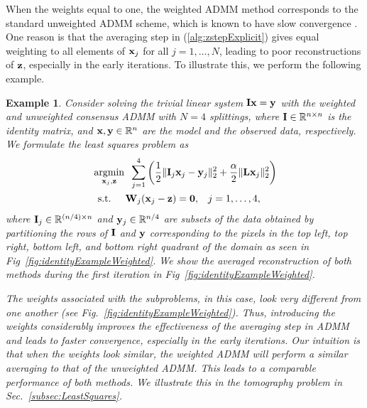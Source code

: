 \documentclass[11pt]{article}          %
\newtheorem{example}{Example}
\DeclareMathOperator*{\argmin}{argmin}
\newcommand{\hf}{\frac12}
\newcommand{\bbR}{\mathbb{R}}
\newcommand{\bfL}{{\bf L}}
\newcommand{\bfI}{{\bf I}}
\newcommand{\bfW}{{\bf W}}
\newcommand{\bfy}{{\bf  y}}
\newcommand{\bfx}{{\bf  x}}
\newcommand{\bfz}{{\bf z}}
\begin{document}
When the weights equal to one, the weighted ADMM method corresponds to the standard unweighted ADMM scheme, which is known to have slow convergence \cite{boyd2011distributed}. One reason is that the averaging step in (\ref{alg:zstepExplicit}) gives equal weighting to all elements of $\bfx_j$ for all $j=1,\ldots,N$, leading to poor reconstructions of $\bfz$, especially in the early iterations. To illustrate this, we perform the following example.
\begin{example} \label{ex:identity}
  Consider solving the trivial linear system $\bfI \bfx = \bfy$ with the weighted and unweighted consensus ADMM with $N=4$ splittings, where $\bfI \in \bbR^{n \times n}$ is the identity matrix, and $\bfx, \bfy \in \bbR^n$ are the model and the observed data, respectively. We formulate the least squares problem as 
  \begin{align}
    &\argmin_{\bfx_j, \bfz} \;\; \sum_{j=1}^4 \left( \hf \| \bfI_j \bfx_j - \bfy_j \|_2^2 + \frac{\alpha}{2} \| \bfL \bfx_j \|_2^2 \right)
    \\
    &\;\;\text{\normalfont  s.t. } \quad \bfW_j(\bfx_j - \bfz) = \boldsymbol{0}, \;\;\; j=1,\ldots,4,
  \end{align}
  where $\bfI_j \in \bbR^{(n/4) \times n}$ and $\bfy_j \in \bbR^{n/4}$ are subsets of the data obtained by partitioning the rows of $\bfI$ and $\bfy$ corresponding to the pixels in the top left, top right, bottom left, and bottom right quadrant of the domain as seen in Fig~\ref{fig:identityExampleWeighted}. We show the averaged reconstruction of both methods during the first iteration in Fig~\ref{fig:identityExampleWeighted}.
  
The weights associated with the subproblems, in this case, look very different from one another (see Fig.~\ref{fig:identityExampleWeighted}). Thus, introducing the weights considerably improves the effectiveness of the averaging step in ADMM and leads to faster convergence, especially in the early iterations. Our intuition is that when the weights look similar, the weighted ADMM will perform a similar averaging to that of the unweighted ADMM. This leads to a comparable performance of both methods. We illustrate this in the tomography problem in Sec.~\ref{subsec:LeastSquares}. 
\end{example}
\end{document}
